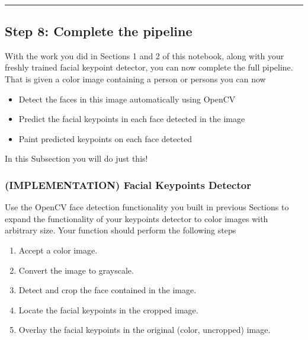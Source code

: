 \documentclass[11pt]{article}
\providecommand{\tightlist}{%
      \setlength{\itemsep}{0pt}\setlength{\parskip}{0pt}}
\begin{document}
    \begin{center}
    \end{center}
    { \hspace*{\fill} \\}
    
    \begin{center}\rule{0.5\linewidth}{\linethickness}\end{center}

\hypertarget{step-8-complete-the-pipeline}{%
\subsection{Step 8: Complete the
pipeline}\label{step-8-complete-the-pipeline}}

With the work you did in Sections 1 and 2 of this notebook, along with
your freshly trained facial keypoint detector, you can now complete the
full pipeline. That is given a color image containing a person or
persons you can now

\begin{itemize}
\tightlist
\item
  Detect the faces in this image automatically using OpenCV
\item
  Predict the facial keypoints in each face detected in the image
\item
  Paint predicted keypoints on each face detected
\end{itemize}

In this Subsection you will do just this!

    \hypertarget{implementation-facial-keypoints-detector}{%
\subsubsection{(IMPLEMENTATION) Facial Keypoints
Detector}\label{implementation-facial-keypoints-detector}}

Use the OpenCV face detection functionality you built in previous
Sections to expand the functionality of your keypoints detector to color
images with arbitrary size. Your function should perform the following
steps

\begin{enumerate}
\def\labelenumi{\arabic{enumi}.}
\tightlist
\item
  Accept a color image.
\item
  Convert the image to grayscale.
\item
  Detect and crop the face contained in the image.
\item
  Locate the facial keypoints in the cropped image.
\item
  Overlay the facial keypoints in the original (color, uncropped) image.
\end{enumerate}
\end{document}
